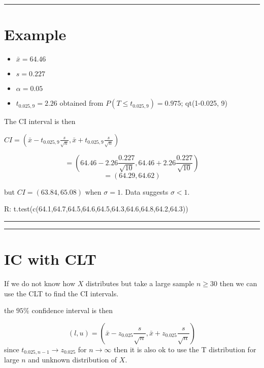 \documentclass[
]{book}
\providecommand{\tightlist}{%
  \setlength{\itemsep}{0pt}\setlength{\parskip}{0pt}}
\begin{document}
\begin{center}\rule{0.5\linewidth}{0.5pt}\end{center}

\hypertarget{example-20}{%
\section{Example}\label{example-20}}

\begin{itemize}
\tightlist
\item
  \(\bar{x}=64.46\)
\item
  \(s=0.227\)
\item
  \(\alpha=0.05\)
\item
  \(t_{0.025,9}=2.26\) obtained from \(P(T \leq t_{0.025,9})=0.975\); qt(1-0.025, 9)
\end{itemize}

The CI interval is then

\(CI=(\bar{x}- t_{0.025,9}\frac{s}{\sqrt{n}},\bar{x}+t_{0.025,9} \frac{s}{\sqrt{n}})\)

\[=(64.46-2.26 \frac{0.227}{\sqrt{10}},64.46+2.26 \frac{0.227}{\sqrt{10}})\] \[=(64.29,64.62)\]

but \(CI=(63.84,65.08)\) when \(\sigma=1\). Data suggests \(\sigma<1\).

R: t.test(c(64.1,64.7,64.5,64.6,64.5,64.3,64.6,64.8,64.2,64.3))

\begin{center}\rule{0.5\linewidth}{0.5pt}\end{center}

\begin{center}\rule{0.5\linewidth}{0.5pt}\end{center}

\hypertarget{ic-with-clt}{%
\section{IC with CLT}\label{ic-with-clt}}

If we do not know how \(X\) distributes but take a large sample \(n\ge 30\) then we can use the CLT to find the CI intervals.

the \(95\%\) confidence interval is then

\[(l,u)=(\bar{x}-z_{0.025} \frac{s}{\sqrt{n}}, \bar{x}+z_{0.025} \frac{s}{\sqrt{n}})\]
since \(t_{0.025, n-1} \rightarrow z_{0.025}\) for \(n \rightarrow \infty\) then it is also ok to use the T distribution for large \(n\) and unknown distribution of \(X\).
\end{document}
